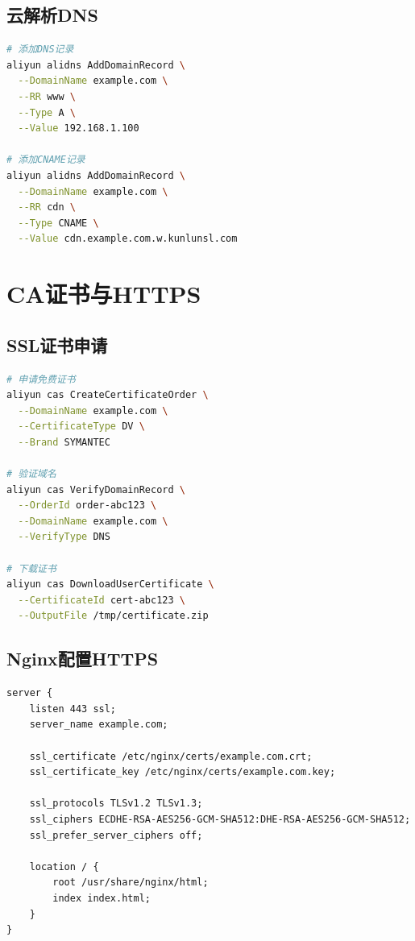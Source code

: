 \documentclass[12pt,UTF8]{ctexbook}
\begin{document}
\subsection{云解析DNS}

\begin{lstlisting}[language=bash]
# 添加DNS记录
aliyun alidns AddDomainRecord \
  --DomainName example.com \
  --RR www \
  --Type A \
  --Value 192.168.1.100

# 添加CNAME记录
aliyun alidns AddDomainRecord \
  --DomainName example.com \
  --RR cdn \
  --Type CNAME \
  --Value cdn.example.com.w.kunlunsl.com
\end{lstlisting}

\section{CA证书与HTTPS}
\label{sec:ca-https-cloud}

\subsection{SSL证书申请}

\begin{lstlisting}[language=bash]
# 申请免费证书
aliyun cas CreateCertificateOrder \
  --DomainName example.com \
  --CertificateType DV \
  --Brand SYMANTEC

# 验证域名
aliyun cas VerifyDomainRecord \
  --OrderId order-abc123 \
  --DomainName example.com \
  --VerifyType DNS

# 下载证书
aliyun cas DownloadUserCertificate \
  --CertificateId cert-abc123 \
  --OutputFile /tmp/certificate.zip
\end{lstlisting}

\subsection{Nginx配置HTTPS}

\begin{lstlisting}
server {
    listen 443 ssl;
    server_name example.com;

    ssl_certificate /etc/nginx/certs/example.com.crt;
    ssl_certificate_key /etc/nginx/certs/example.com.key;

    ssl_protocols TLSv1.2 TLSv1.3;
    ssl_ciphers ECDHE-RSA-AES256-GCM-SHA512:DHE-RSA-AES256-GCM-SHA512;
    ssl_prefer_server_ciphers off;

    location / {
        root /usr/share/nginx/html;
        index index.html;
    }
}
\end{lstlisting}
\end{document}
